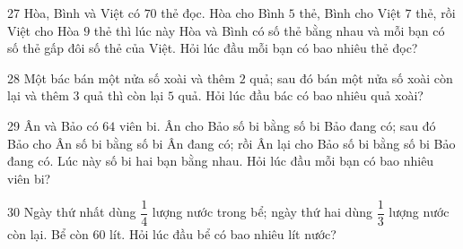 \gap
\begin{probbox}{27}{\relax}
Hòa, Bình và Việt có $70$ thẻ đọc. Hòa cho Bình $5$ thẻ, Bình cho Việt $7$ thẻ, rồi Việt cho Hòa $9$ thẻ thì lúc này Hòa và Bình có số thẻ bằng nhau và mỗi bạn có số thẻ gấp đôi số thẻ của Việt. Hỏi lúc đầu mỗi bạn có bao nhiêu thẻ đọc?
\end{probbox}
\gap
\begin{probbox}{28}{\relax}
Một bác bán một nửa số xoài và thêm $2$ quả; sau đó bán một nửa số xoài còn lại và thêm $3$ quả thì còn lại $5$ quả. Hỏi lúc đầu bác có bao nhiêu quả xoài?
\end{probbox}
\gap
\begin{probbox}{29}{\relax}
Ân và Bảo có $64$ viên bi. Ân cho Bảo số bi bằng số bi Bảo đang có; sau đó Bảo cho Ân số bi bằng số bi Ân đang có; rồi Ân lại cho Bảo số bi bằng số bi Bảo đang có. Lúc này số bi hai bạn bằng nhau. Hỏi lúc đầu mỗi bạn có bao nhiêu viên bi?
\end{probbox}
\gap
\begin{probbox}{30}{\relax}
Ngày thứ nhất dùng $\dfrac14$ lượng nước trong bể; ngày thứ hai dùng $\dfrac13$ lượng nước còn lại. Bể còn $60$ lít. Hỏi lúc đầu bể có bao nhiêu lít nước?
\end{probbox}

